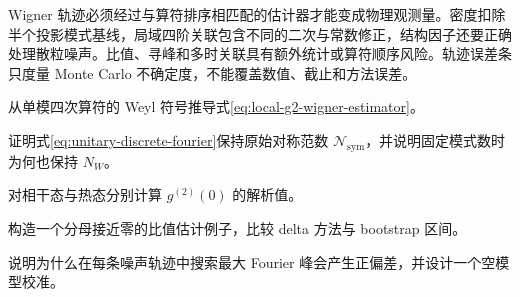 Wigner 轨迹必须经过与算符排序相匹配的估计器才能变成物理观测量。密度扣除半个投影模式基线，局域四阶关联包含不同的二次与常数修正，结构因子还要正确处理散粒噪声。比值、寻峰和多时关联具有额外统计或算符顺序风险。轨迹误差条只度量 Monte Carlo 不确定度，不能覆盖数值、截止和方法误差。

\begin{exercises}
  \item 从单模四次算符的 Weyl 符号推导式\eqref{eq:local-g2-wigner-estimator}。
  \item 证明式\eqref{eq:unitary-discrete-fourier}保持原始对称范数
  $\mathcal N_{\mathrm{sym}}$，并说明固定模式数时为何也保持 $N_W$。
  \item 对相干态与热态分别计算 $g^{(2)}(0)$ 的解析值。
  \item 构造一个分母接近零的比值估计例子，比较 delta 方法与 bootstrap 区间。
  \item 说明为什么在每条噪声轨迹中搜索最大 Fourier 峰会产生正偏差，并设计一个空模型校准。
\end{exercises}
